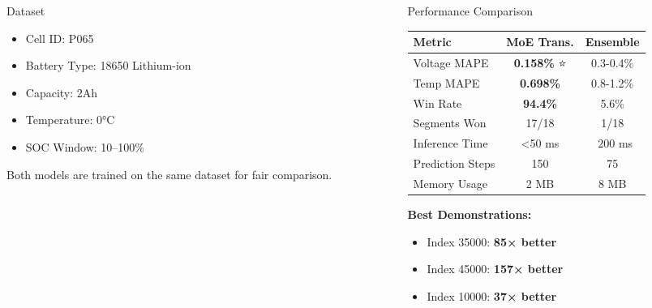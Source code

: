 \documentclass[final]{beamer}
\begin{document}
\begin{frame}[t]
\begin{columns}[t]
\begin{column}{0.34\textwidth}
\begin{alertblock}{Dataset}
\begin{itemize}
\item Cell ID: P065
\item Battery Type: 18650 Lithium-ion
\item Capacity: 2Ah
\item Temperature: 0°C
\item SOC Window: 10–100\%
\end{itemize}

Both models are trained on the same dataset for fair comparison.

\end{alertblock}

\end{column}


\begin{column}{0.32\textwidth}

\begin{block}{Performance Comparison}

\begin{table}
\centering
\begin{tabular}{lcc}
\toprule
\textbf{Metric} & \textbf{MoE Trans.} & \textbf{Ensemble} \\
\midrule
Voltage MAPE & \textbf{0.158\%} ⭐ & 0.3-0.4\% \\
Temp MAPE & \textbf{0.698\%} & 0.8-1.2\% \\
Win Rate & \textbf{94.4\%} & 5.6\% \\
Segments Won & 17/18 & 1/18 \\
Inference Time & <50 ms & ~200 ms \\
Prediction Steps & 150 & 75 \\
Memory Usage & 2 MB & 8 MB \\
\bottomrule
\end{tabular}
\end{table}

\vspace{0.5cm}

\textbf{Best Demonstrations:}
\begin{itemize}
\item Index 35000: \textbf{85× better}
\item Index 45000: \textbf{157× better}
\item Index 10000: \textbf{37× better}
\end{itemize}


\end{block}
\end{column}
\end{columns}
\end{frame}
\end{document}

